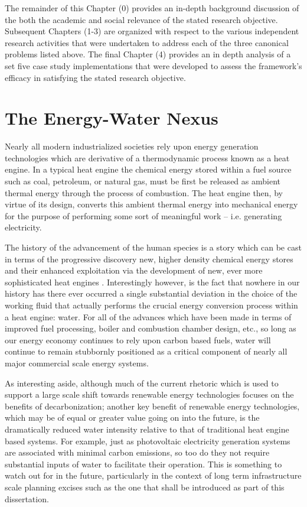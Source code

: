 The remainder of this Chapter (0) provides an in-depth background discussion of the both the academic and social relevance of the stated research objective. Subsequent Chapters (1-3) are organized with respect to the various independent research activities that were undertaken to address each of the three canonical problems listed above. The final Chapter (4) provides an in depth analysis of a set five case study implementations that were developed to assess the framework's efficacy in satisfying the stated research objective. 

\section{The Energy-Water Nexus}
  
Nearly all modern industrialized societies rely upon energy generation technologies which are derivative of a thermodynamic process known as a heat engine. In a typical heat engine the chemical energy stored within a fuel source such as coal, petroleum, or natural gas, must be first be released as ambient thermal energy through the process of combustion. The heat engine then, by virtue of its design, converts this ambient thermal energy into mechanical energy for the purpose of performing some sort of meaningful work -- i.e. generating electricity.
    
The history of the advancement of the human species is a story which can be cast in terms of the progressive discovery new, higher density chemical energy stores and their enhanced exploitation via the development of new, ever more sophisticated heat engines \cite{Grubler2003,Grubler2010}. Interestingly however, is the fact that nowhere in our history has there ever occurred a single substantial deviation in the choice of the working fluid that actually performs the crucial energy conversion process within a heat engine: water. For all of the advances which have been made in terms of improved fuel processing, boiler and combustion chamber design, etc., so long as our energy economy continues to rely upon carbon based fuels, water will continue to remain stubbornly positioned as a critical component of nearly all major commercial scale energy systems.
    
As interesting aside, although much of the current rhetoric which is used to support a large scale shift towards renewable energy technologies focuses on the benefits of decarbonization; another key benefit of renewable energy technologies, which may be of equal or greater value going on into the future, is the dramatically reduced water intensity relative to that of traditional heat engine based systems. For example, just as photovoltaic electricity generation systems are associated with minimal carbon emissions, so too do they not require substantial inputs of water to facilitate their operation. This is something to watch out for in the future, particularly in the context of long term infrastructure scale planning excises such as the one that shall be introduced as part of this dissertation.
        
